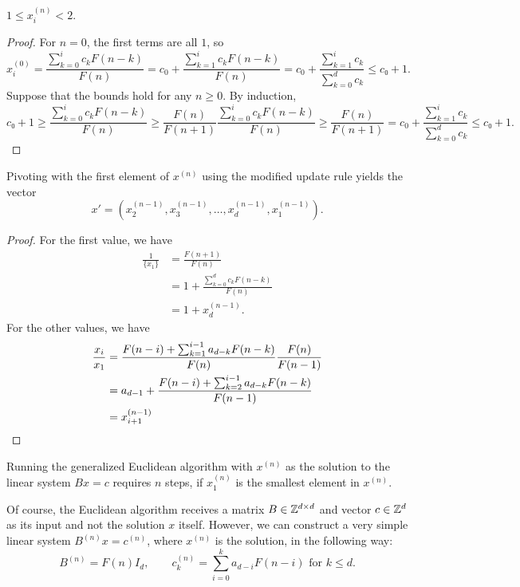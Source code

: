 \begin{lemma}
  $1 ≤ x_i^{(n)} < 2$.
\end{lemma}

\begin{proof}
  For $n = 0$, the first terms are all $1$, so
  \[
    x_i^{(0)}
    = \frac{\sum_{k=0}^i c_k F(n - k)}{F(n)}
    = c_0 + \frac{\sum_{k=1}^i c_k F(n - k)}{F(n)}
    = c_0 + \frac{\sum_{k=1}^i c_k}{\sum_{k=0}^d c_k}
    ≤ c₀ + 1.
  \]
  Suppose that the bounds hold for any $n ≥ 0$.
  By induction,
  \[
    c₀ + 1
    ≥ \frac{\sum_{k=0}^i c_k F(n - k)}{F(n)}
    ≥ \frac{F(n)}{F(n+1)} \frac{\sum_{k=0}^i c_k F(n - k)}{F(n)}
    ≥ \frac{F(n)}{F(n+1)}
    = c_0 + \frac{\sum_{k=1}^i c_k}{\sum_{k=0}^d c_k}
    ≤ c₀ + 1.
  \]
\end{proof}

\begin{lemma}
  Pivoting with the first element of $x^{(n)}$ using the modified update rule yields the vector
  \[
    x' = (x^{(n-1)}_2, x^{(n-1)}_3, \dots, x^{(n-1)}_d, x^{(n-1)}_1).
  \]
\end{lemma}

\begin{proof}
  For the first value, we have
  \[
    \begin{aligned}
      \frac{1}{\{x_1\}}
      & = \frac{F(n+1)}{F(n)} \\
      & = 1 + \frac{\sum_{k=0}^d c_k F(n - k)}{F(n)} \\
      & = 1 + x^{(n-1)}_d.
    \end{aligned}
  \]
  For the other values, we have
  \begin{align*}
    \frac{x_i}{x_1}
    & = \frac{F(n - i) + \sum_{k=1}^{i-1} a_{d-k} F(n - k)}{F(n)} \frac{F(n)}{F(n - 1)} \\
    & = a_{d-1} + \frac{F(n - i) + \sum_{k=2}^{i-1} a_{d-k} F(n - k)}{F(n-1)} \\
    & = x^{(n-1)}_{i+1} \qedhere
  \end{align*}
\end{proof}

\begin{corollary}
  Running the generalized Euclidean algorithm with $x^{(n)}$ as the solution to
  the linear system $B x = c$ requires $n$ steps, if $x^{(n)}_1$ is the
  smallest element in $x^{(n)}$.
\end{corollary}

Of course, the Euclidean algorithm receives a matrix $B \in {\mathbb Z}^{d \times d}$
and vector $c \in {\mathbb Z}^d$ as its input and not the solution $x$ itself.
However, we can construct a very simple linear system $B^{(n)} x = c^{(n)}$,
where $x^{(n)}$ is the solution, in the following way:
\[
  B^{(n)} = F(n) I_d, \qquad c^{(n)}_k = \sum_{i=0}^k a_{d-i} F(n - i) \text{ for } k ≤ d.
\]
\fi

